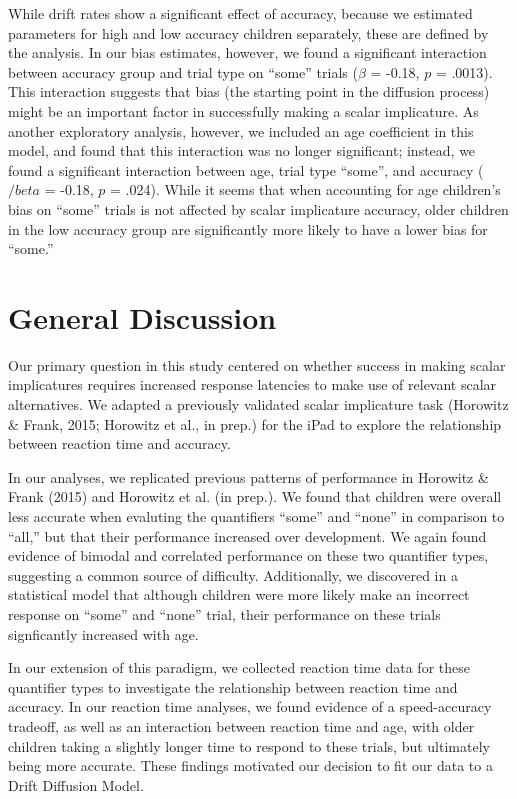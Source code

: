 \documentclass[10pt, letterpaper]{article}
\begin{document}
While drift rates show a significant effect of accuracy, because we
estimated parameters for high and low accuracy children separately,
these are defined by the analysis. In our bias estimates, however, we
found a significant interaction between accuracy group and trial type on
``some'' trials (\(\beta\) = -0.18, \(p\) = .0013). This interaction
suggests that bias (the starting point in the diffusion process) might
be an important factor in successfully making a scalar implicature. As
another exploratory analysis, however, we included an age coefficient in
this model, and found that this interaction was no longer significant;
instead, we found a significant interaction between age, trial type
``some'', and accuracy (\(/beta\) = -0.18, \(p\) = .024). While it seems
that when accounting for age children's bias on ``some'' trials is not
affected by scalar implicature accuracy, older children in the low
accuracy group are significantly more likely to have a lower bias for
``some.''

\section{General Discussion}\label{general-discussion}

Our primary question in this study centered on whether success in making
scalar implicatures requires increased response latencies to make use of
relevant scalar alternatives. We adapted a previously validated scalar
implicature task (Horowitz \& Frank, 2015; Horowitz et al., in prep.)
for the iPad to explore the relationship between reaction time and
accuracy.

In our analyses, we replicated previous patterns of performance in
Horowitz \& Frank (2015) and Horowitz et al. (in prep.). We found that
children were overall less accurate when evaluting the quantifiers
``some'' and ``none'' in comparison to ``all,'' but that their
performance increased over development. We again found evidence of
bimodal and correlated performance on these two quantifier types,
suggesting a common source of difficulty. Additionally, we discovered in
a statistical model that although children were more likely make an
incorrect response on ``some'' and ``none'' trial, their performance on
these trials signficantly increased with age.

In our extension of this paradigm, we collected reaction time data for
these quantifier types to investigate the relationship between reaction
time and accuracy. In our reaction time analyses, we found evidence of a
speed-accuracy tradeoff, as well as an interaction between reaction time
and age, with older children taking a slightly longer time to respond to
these trials, but ultimately being more accurate. These findings
motivated our decision to fit our data to a Drift Diffusion Model.
\end{document}
